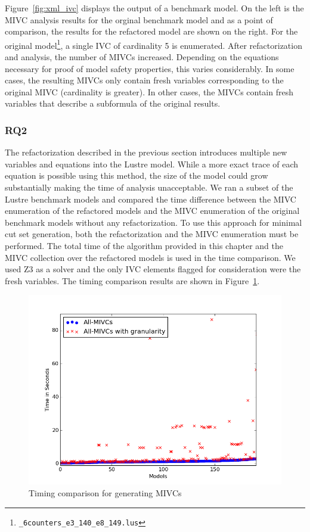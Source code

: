 Figure~\ref{fig:xml_ivc} displays the output of a benchmark model. On the left is the MIVC analysis results for the orginal benchmark model and as a point of comparison, the results for the refactored model are shown on the right. For the original model\footnote{\texttt{\_6counters\_e3\_140\_e8\_149.lus}}, a single IVC of cardinality 5 is enumerated. After refactorization and analysis, the number of MIVCs increased. Depending on the equations necessary for proof of model safety properties, this varies considerably. In some cases, the resulting MIVCs only contain fresh variables corresponding to the original MIVC (cardinality is greater). In other cases, the MIVCs contain fresh variables that describe a subformula of the original results. 

\subsubsection{RQ2}
The refactorization described in the previous section introduces multiple new variables and equations into the Lustre model. While a more exact trace of each equation is possible using this method, the size of the model could grow substantially making the time of analysis unacceptable. We ran a subset of the Lustre benchmark models and compared the time difference between the MIVC enumeration of the refactored models and the MIVC enumeration of the original benchmark models without any refactorization. To use this approach for minimal cut set generation, both the refactorization and the MIVC enumeration must be performed. The total time of the algorithm provided in this chapter and the MIVC collection over the refactored models is used in the time comparison. We used Z3 as a solver and the only IVC elements flagged for consideration were the fresh variables. The timing comparison results are shown in Figure~\ref{fig:granIVC}. 

\begin{figure}[h!]
\begin{center}
\includegraphics[width=.8\textwidth]{images/granularityIVC2.png}
\caption{Timing comparison for generating MIVCs} 
\label{fig:granIVC}
\end{center}
\end{figure}

